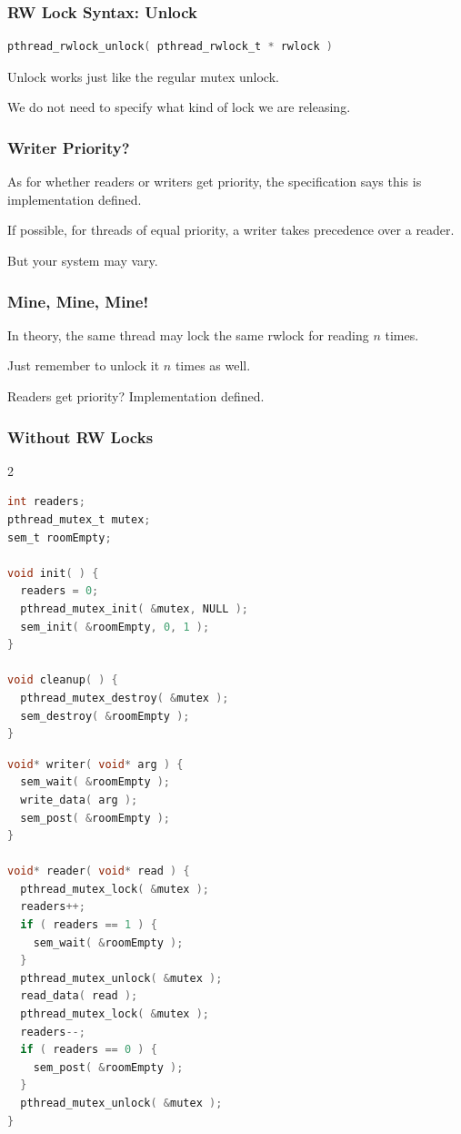 \begin{frame}[fragile]
	\frametitle{RW Lock Syntax: Unlock}

	\begin{lstlisting}[language=C]
pthread_rwlock_unlock( pthread_rwlock_t * rwlock )
\end{lstlisting}

	Unlock works just like the regular mutex unlock.

	We do not need to specify what kind of lock we are releasing.

\end{frame}


\begin{frame}
	\frametitle{Writer Priority?}

	As for whether readers or writers get priority, the specification says this is implementation defined.

	If possible, for threads of equal priority, a writer takes precedence over a reader.

	But your system may vary.


\end{frame}



\begin{frame}
	\frametitle{Mine, Mine, Mine!}

	In theory, the same thread may lock the same rwlock for reading $n$ times.

	Just remember to unlock it $n$ times as well.

	Readers get priority? Implementation defined.

\end{frame}


\begin{frame}[fragile]
	\frametitle{Without RW Locks}

	\begin{multicols}{2}
		\begin{lstlisting}[language=C]
int readers;
pthread_mutex_t mutex;
sem_t roomEmpty;

void init( ) {
  readers = 0;
  pthread_mutex_init( &mutex, NULL );
  sem_init( &roomEmpty, 0, 1 );
}

void cleanup( ) {
  pthread_mutex_destroy( &mutex );
  sem_destroy( &roomEmpty );
}
\end{lstlisting}

		\columnbreak

		\begin{lstlisting}[language=C]
void* writer( void* arg ) {
  sem_wait( &roomEmpty );
  write_data( arg );
  sem_post( &roomEmpty );
}

void* reader( void* read ) {
  pthread_mutex_lock( &mutex );
  readers++;
  if ( readers == 1 ) {
    sem_wait( &roomEmpty );
  }
  pthread_mutex_unlock( &mutex );
  read_data( read );
  pthread_mutex_lock( &mutex );
  readers--;
  if ( readers == 0 ) {
    sem_post( &roomEmpty );
  }
  pthread_mutex_unlock( &mutex );
}
\end{lstlisting}

	\end{multicols}


\end{frame}


